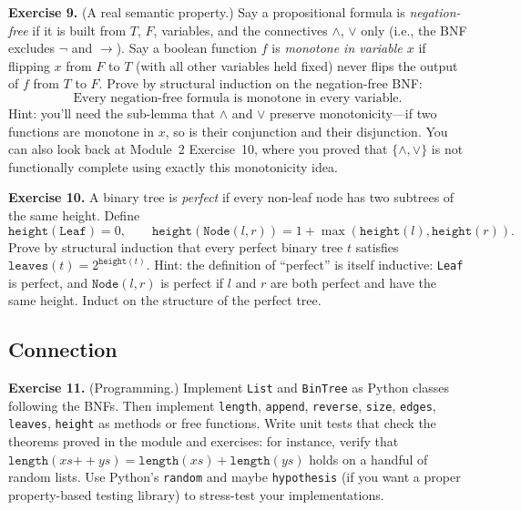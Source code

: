 \documentclass[11pt]{article}
\begin{document}
\bigskip
\textbf{Exercise 9.}\label{ex:m10:9} (A real semantic property.) Say a propositional formula is \emph{negation-free} if it is built from $T$, $F$, variables, and the connectives $\wedge$, $\vee$ only (i.e., the BNF excludes $\lnot$ and $\to$). Say a boolean function $f$ is \emph{monotone in variable $x$} if flipping $x$ from $F$ to $T$ (with all other variables held fixed) never flips the output of $f$ from $T$ to $F$. Prove by structural induction on the negation-free BNF:
\[
  \text{Every negation-free formula is monotone in every variable.}
\]
Hint: you'll need the sub-lemma that $\wedge$ and $\vee$ preserve monotonicity---if two functions are monotone in $x$, so is their conjunction and their disjunction. You can also look back at Module~2 Exercise~10, where you proved that $\{\wedge, \vee\}$ is not functionally complete using exactly this monotonicity idea.

\bigskip
\textbf{Exercise 10.}\label{ex:m10:10} A binary tree is \emph{perfect} if
every non-leaf node has two subtrees of the same height. Define
\[
  \texttt{height}(\texttt{Leaf}) = 0,\qquad
  \texttt{height}(\texttt{Node}(l, r))
    = 1 + \max(\texttt{height}(l), \texttt{height}(r)).
\]
Prove by structural induction that every perfect binary tree $t$
satisfies $\texttt{leaves}(t) = 2^{\texttt{height}(t)}$. Hint: the
definition of ``perfect'' is itself inductive: \texttt{Leaf} is perfect,
and $\texttt{Node}(l, r)$ is perfect if $l$ and $r$ are both perfect and
have the same height. Induct on the structure of the perfect tree.

\subsection*{Connection}

\textbf{Exercise 11.}\label{ex:m10:11} (Programming.) Implement \texttt{List} and \texttt{BinTree} as Python classes following the BNFs. Then implement \texttt{length}, \texttt{append}, \texttt{reverse}, \texttt{size}, \texttt{edges}, \texttt{leaves}, \texttt{height} as methods or free functions. Write unit tests that check the theorems proved in the module and exercises: for instance, verify that $\texttt{length}(xs \mathbin{++} ys) = \texttt{length}(xs) + \texttt{length}(ys)$ holds on a handful of random lists. Use Python's \texttt{random} and maybe \texttt{hypothesis} (if you want a proper property-based testing library) to stress-test your implementations.
\end{document}
